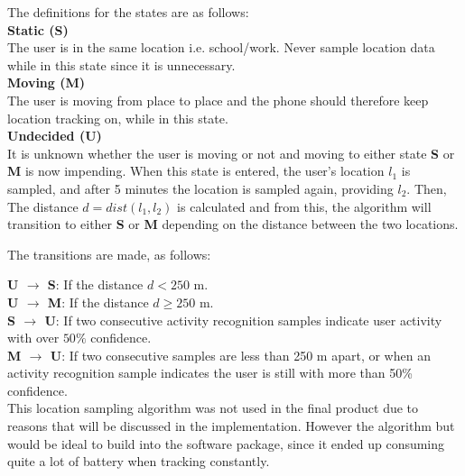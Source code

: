 The definitions for the states are as follows:\\

\textbf{Static (S)}\\
The user is in the same location i.e. school/work. Never sample location data while in this state since it is unnecessary.\\

\textbf{Moving (M)}\\
The user is moving from place to place and the phone should therefore keep location tracking on, while in this state.\\

\textbf{Undecided (U)}\\
It is unknown whether the user is moving or not and moving to either state \textbf{S} or \textbf{M} is now impending. When this state is entered, the user's location $l_1$ is sampled, and after 5 minutes the location is sampled again, providing $l_2$. Then,  The distance $d = dist(l_1, l_2)$ is calculated and from this, the algorithm will transition to either \textbf{S} or \textbf{M} depending on the distance between the two locations.

The transitions are made, as follows:

\textbf{U $\rightarrow$ S}: If the distance $d < 250$ m.\\

\textbf{U $\rightarrow$ M}: If the distance $d \geq 250$ m.\\

\textbf{S $\rightarrow$ U}: If two consecutive activity recognition samples indicate user activity with over $50\%$ confidence.\\

\textbf{M $\rightarrow$  U}: If two consecutive samples are less than 250 m apart, or when an activity recognition sample indicates the user is still with more than 50\% confidence.\\

This location sampling algorithm was not used in the final product due to reasons that will be discussed in the implementation. However the algorithm  but would be ideal to build into the software package, since it ended up consuming quite a lot of battery when tracking constantly.
